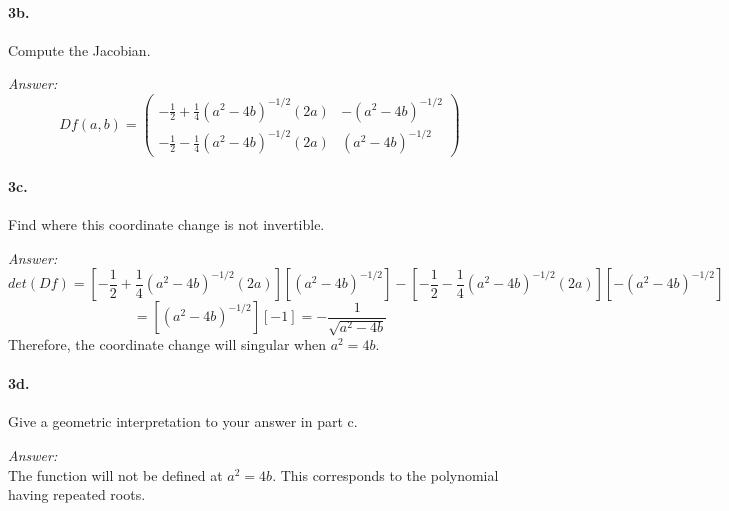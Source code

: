 \documentclass[10pt,a4paper]{article}
\begin{document}
\paragraph{3b.} Compute the Jacobian.
\begin{flushleft}
\textit{Answer:}\\
$$Df(a,b) = 
\begin{pmatrix}
-\frac{1}{2}+\frac{1}{4}(a^2-4b)^{-1/2}(2a) & -(a^2-4b)^{-1/2}\\
-\frac{1}{2}-\frac{1}{4}(a^2-4b)^{-1/2}(2a) & (a^2-4b)^{-1/2}
\end{pmatrix}$$
\end{flushleft}

\paragraph{3c.} Find where this coordinate change is not invertible.
\begin{flushleft}
\textit{Answer:}\\
$$ det(Df) = \left[ -\frac{1}{2}+\frac{1}{4}(a^2-4b)^{-1/2}(2a) \right]\left[ (a^2-4b)^{-1/2}\right] - \left[ -\frac{1}{2}-\frac{1}{4}(a^2-4b)^{-1/2}(2a)\right]\left[ -(a^2-4b)^{-1/2}\right]$$
$$  = \left[ (a^2-4b)^{-1/2}\right]\left[ -1\right] = -\frac{1}{\sqrt{a^2-4b}}$$
Therefore, the coordinate change will singular when $a^2 = 4b$.
\end{flushleft}

\paragraph{3d.} Give a geometric interpretation to your answer in part c.
\begin{flushleft}
\textit{Answer:}\\
The function will not be defined at $a^2 = 4b$. This corresponds to the polynomial having repeated roots.
\end{flushleft}
\end{document}
